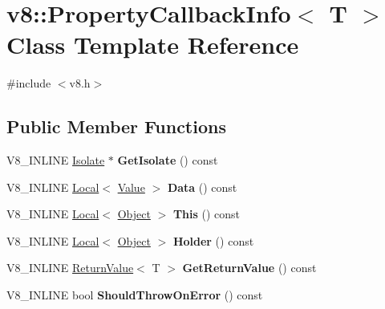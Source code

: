\hypertarget{classv8_1_1PropertyCallbackInfo}{}\section{v8\+:\+:Property\+Callback\+Info$<$ T $>$ Class Template Reference}
\label{classv8_1_1PropertyCallbackInfo}


{\ttfamily \#include $<$v8.\+h$>$}

\subsection*{Public Member Functions}
\begin{DoxyCompactItemize}
\item 
V8\+\_\+\+I\+N\+L\+I\+NE \hyperlink{classv8_1_1Isolate}{Isolate} $\ast$ {\bfseries Get\+Isolate} () const \hypertarget{classv8_1_1PropertyCallbackInfo_a066d0c9eee98f80fb78d97961eafa8ad}{}\label{classv8_1_1PropertyCallbackInfo_a066d0c9eee98f80fb78d97961eafa8ad}

\item 
V8\+\_\+\+I\+N\+L\+I\+NE \hyperlink{classv8_1_1Local}{Local}$<$ \hyperlink{classv8_1_1Value}{Value} $>$ {\bfseries Data} () const \hypertarget{classv8_1_1PropertyCallbackInfo_a64edbaeb902e360fc2a4d353c8c4930f}{}\label{classv8_1_1PropertyCallbackInfo_a64edbaeb902e360fc2a4d353c8c4930f}

\item 
V8\+\_\+\+I\+N\+L\+I\+NE \hyperlink{classv8_1_1Local}{Local}$<$ \hyperlink{classv8_1_1Object}{Object} $>$ {\bfseries This} () const \hypertarget{classv8_1_1PropertyCallbackInfo_a747202a7d4db0b930f19f9466c3a5acb}{}\label{classv8_1_1PropertyCallbackInfo_a747202a7d4db0b930f19f9466c3a5acb}

\item 
V8\+\_\+\+I\+N\+L\+I\+NE \hyperlink{classv8_1_1Local}{Local}$<$ \hyperlink{classv8_1_1Object}{Object} $>$ {\bfseries Holder} () const \hypertarget{classv8_1_1PropertyCallbackInfo_a8eb97205ce7bd25b446b03643d02570d}{}\label{classv8_1_1PropertyCallbackInfo_a8eb97205ce7bd25b446b03643d02570d}

\item 
V8\+\_\+\+I\+N\+L\+I\+NE \hyperlink{classv8_1_1ReturnValue}{Return\+Value}$<$ T $>$ {\bfseries Get\+Return\+Value} () const \hypertarget{classv8_1_1PropertyCallbackInfo_a4e9bc4da66ed3ea21aac7dbb9c11465b}{}\label{classv8_1_1PropertyCallbackInfo_a4e9bc4da66ed3ea21aac7dbb9c11465b}

\item 
V8\+\_\+\+I\+N\+L\+I\+NE bool {\bfseries Should\+Throw\+On\+Error} () const \hypertarget{classv8_1_1PropertyCallbackInfo_a6b5104e088ca57f80be66435d6b2f0e2}{}\label{classv8_1_1PropertyCallbackInfo_a6b5104e088ca57f80be66435d6b2f0e2}

\end{DoxyCompactItemize}
